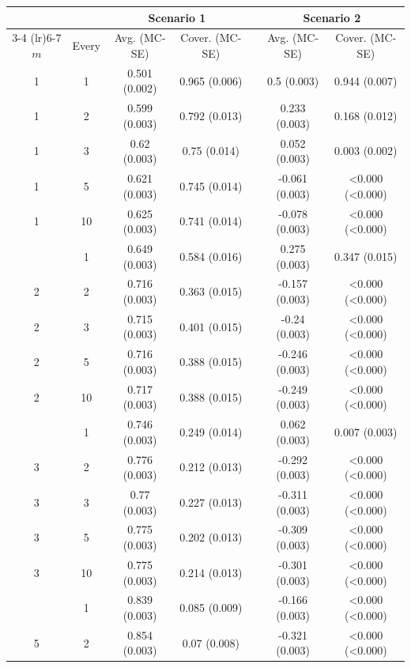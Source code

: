 \documentclass[man]{apa7} %
\begin{document}
 \begin{table}[]
    \centering
    \footnotesize
    \begin{tabular}[t]{ccccccc}
        \toprule
            &       & \multicolumn{2}{c}{Scenario 1} & & \multicolumn{2}{c}{Scenario 2} \\
        \cmidrule(lr){3-4} \cmidrule(lr){6-7}
        $m$ & Every & Avg. (MC-SE) & Cover. (MC-SE) & & Avg. (MC-SE) & Cover. (MC-SE) \\
        \midrule
        1 & 1 & 0.501 (0.002) & 0.965 (0.006) & & 0.5 (0.003) & 0.944 (0.007)\\
        1 & 2 & 0.599 (0.003) & 0.792 (0.013) & & 0.233 (0.003) & 0.168 (0.012)\\
        1 & 3 & 0.62 (0.003) & 0.75 (0.014) & & 0.052 (0.003) & 0.003 (0.002)\\
        1 & 5 & 0.621 (0.003) & 0.745 (0.014) & & -0.061 (0.003) & <0.000 (<0.000)\\
        1 & 10 & 0.625 (0.003) & 0.741 (0.014) & & -0.078 (0.003) & <0.000 (<0.000)\\
        \addlinespace
        2 & 1 & 0.649 (0.003) & 0.584 (0.016) & & 0.275 (0.003) & 0.347 (0.015)\\
        2 & 2 & 0.716 (0.003) & 0.363 (0.015) & & -0.157 (0.003) & <0.000 (<0.000)\\
        2 & 3 & 0.715 (0.003) & 0.401 (0.015) & & -0.24 (0.003) & <0.000 (<0.000)\\
        2 & 5 & 0.716 (0.003) & 0.388 (0.015) & & -0.246 (0.003) & <0.000 (<0.000)\\
        2 & 10 & 0.717 (0.003) & 0.388 (0.015) & & -0.249 (0.003) & <0.000 (<0.000)\\
        \addlinespace
        3 & 1 & 0.746 (0.003) & 0.249 (0.014) & & 0.062 (0.003) & 0.007 (0.003)\\
        3 & 2 & 0.776 (0.003) & 0.212 (0.013) & & -0.292 (0.003) & <0.000 (<0.000)\\
        3 & 3 & 0.77 (0.003) & 0.227 (0.013) & & -0.311 (0.003) & <0.000 (<0.000)\\
        3 & 5 & 0.775 (0.003) & 0.202 (0.013) & & -0.309 (0.003) & <0.000 (<0.000)\\
        3 & 10 & 0.775 (0.003) & 0.214 (0.013) & & -0.301 (0.003) & <0.000 (<0.000)\\
        \addlinespace
        5 & 1 & 0.839 (0.003) & 0.085 (0.009) & & -0.166 (0.003) & <0.000 (<0.000)\\
        5 & 2 & 0.854 (0.003) & 0.07 (0.008) & & -0.321 (0.003) & <0.000 (<0.000)\\

\end{tabular}
\end{table}
\end{document}
